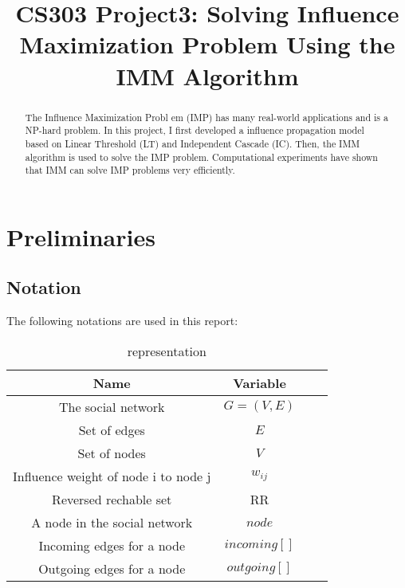 \documentclass[conference]{IEEEtran}
\begin{document}
  
  \title{CS303 Project3: Solving Influence Maximization Problem Using the IMM Algorithm}
  
  \author{
  }
  
  \maketitle
  
  \begin{abstract}
  The Influence Maximization Probl em (IMP) has many real-world applications and is a NP-hard problem. In this project, I first developed a influence propagation model based on Linear Threshold (LT) and Independent Cascade (IC). Then, the IMM algorithm is used to solve the IMP problem. Computational experiments have shown that IMM can solve IMP problems very efficiently.
  \end{abstract}
  \IEEEpeerreviewmaketitle
  
  \section{Preliminaries}
    \subsection{Notation}
    The following notations are used in this report:
    \begin{table}[H]
        \caption{representation}
        \centering
        \begin{tabular}{cccc}
        \toprule
        Name&Variable\\
        \midrule
        The social network&$G=(V,E)$\\
        Set of edges&$E$\\
        Set of nodes&$V$\\
        Influence weight of node i to node j&$w_{ij}$\\
        Reversed rechable set&RR\\
        A node in the social network&$node$\\
        Incoming edges for a node&$incoming[]$\\
        Outgoing edges for a node&$outgoing[]$\\
    
        \bottomrule
        \end{tabular}
        \label{table:1}
        \end{table}
\end{document}
